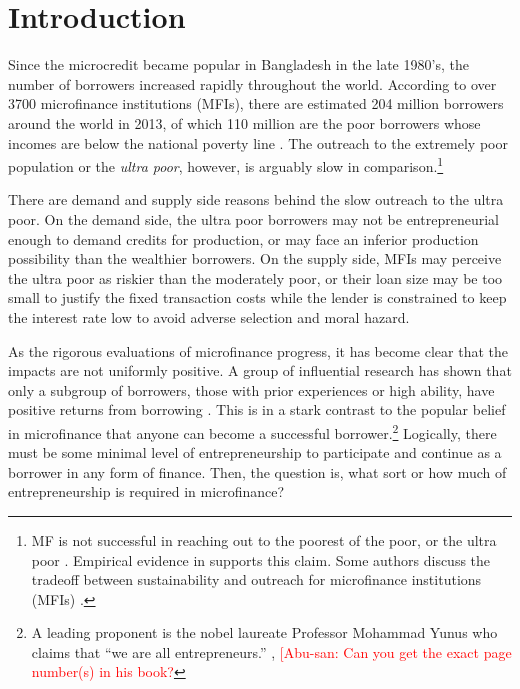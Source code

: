 \newpage
\setcounter{tocdepth}{3}
\tableofcontents
\newpage

\setlength{\parindent}{1em}
\vspace{2ex}




\renewcommand{\thefootnote}{*\arabic{footnote}}
\setcounter{footnote}{0}



\section{Introduction}
\label{SecIntroduction}


	Since the microcredit became popular in Bangladesh in the late 1980's, the number of borrowers increased rapidly throughout the world. According to over 3700 microfinance institutions (MFIs), there are estimated 204 million borrowers around the world in 2013, of which 110 million are the poor borrowers whose incomes are below the national poverty line \citep{MFGateway2015}. The outreach to the extremely poor population or the \textit{ultra poor}, however, is arguably slow in comparison.\footnote{MF is not successful in reaching out to the poorest of the poor, or the ultra poor \citep[][]{Scully2004}. Empirical evidence in \citet{Yaron1994, Navajas2000, RahmanRazzaque2000, AghionMorduch2007} supports this claim. Some authors discuss the tradeoff between sustainability and outreach for microfinance institutions (MFIs) \citet{HermesLensink2011, HermesLensinkMeesters2011, Cull2011}. } 

	There are demand and supply side reasons behind the slow outreach to the ultra poor. On the demand side, the ultra poor borrowers may not be entrepreneurial enough to demand credits for production, or may face an inferior production possibility than the wealthier borrowers. On the supply side, MFIs may perceive the ultra poor as riskier than the moderately poor, or their loan size may be too small to justify the fixed transaction costs while the lender is constrained to keep the interest rate low to avoid adverse selection and moral hazard. 

	As the rigorous evaluations of microfinance progress, it has become clear that the impacts are not uniformly positive. A group of influential research has shown that only a subgroup of borrowers, those with prior experiences or high ability, have positive returns from borrowing \citep{Banerjee2015Miracle, Mckenzie2017Spurring, Buera2017, Banerjee2019MFPovertyTrap}. This is in a stark contrast to the popular belief in microfinance that anyone can become a successful borrower.\footnote{A leading proponent is the nobel laureate Professor Mohammad Yunus who claims that ``we are all entrepreneurs.'' \citep{Yunus2003}, \citep{Cosic2017} \textcolor{red}{[Abu-san: Can you get the exact page number(s) in his book?} } Logically, there must be some minimal level of entrepreneurship to participate and continue as a borrower in any form of finance. Then, the question is, what sort or how much of entrepreneurship is required in microfinance? 
	
